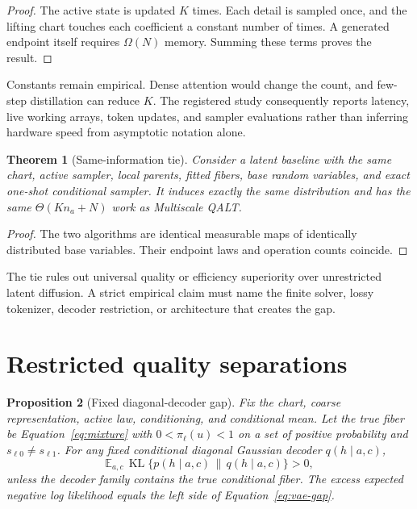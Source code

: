 \documentclass[11pt]{article}
\newtheorem{theorem}{Theorem}[section]
\newtheorem{proposition}[theorem]{Proposition}
\DeclareMathOperator{\KL}{KL}
\newcommand{\E}{\mathbb E}
\begin{document}
\begin{proof}
The active state is updated $K$ times.  Each detail is sampled once, and the lifting chart touches each coefficient a constant number of times.  A generated endpoint itself requires $\Omega(N)$ memory.  Summing these terms proves the result.
\end{proof}

Constants remain empirical.  Dense attention would change the count, and few-step distillation can reduce $K$.  The registered study consequently reports latency, live working arrays, token updates, and sampler evaluations rather than inferring hardware speed from asymptotic notation alone.

\begin{theorem}[Same-information tie]
Consider a latent baseline with the same chart, active sampler, local parents, fitted fibers, base random variables, and exact one-shot conditional sampler.  It induces exactly the same distribution and has the same $\Theta(Kn_a+N)$ work as Multiscale QALT.
\end{theorem}

\begin{proof}
The two algorithms are identical measurable maps of identically distributed base variables.  Their endpoint laws and operation counts coincide.
\end{proof}

The tie rules out universal quality or efficiency superiority over unrestricted latent diffusion.  A strict empirical claim must name the finite solver, lossy tokenizer, decoder restriction, or architecture that creates the gap.

\section{Restricted quality separations}

\begin{proposition}[Fixed diagonal-decoder gap]
Fix the chart, coarse representation, active law, conditioning, and conditional mean.  Let the true fiber be Equation~\eqref{eq:mixture} with $0<\pi_{\ell}(u)<1$ on a set of positive probability and $s_{\ell0}\ne s_{\ell1}$.  For any fixed conditional diagonal Gaussian decoder $q(h\mid a,c)$,
\begin{equation}
\E_{a,c}\,\KL\{p(h\mid a,c)\,\|\,q(h\mid a,c)\}>0,
\label{eq:vae-gap}
\end{equation}
unless the decoder family contains the true conditional fiber.  The excess expected negative log likelihood equals the left side of Equation~\eqref{eq:vae-gap}.
\end{proposition}
\end{document}
